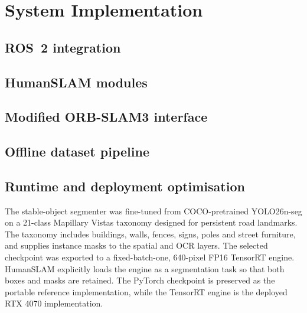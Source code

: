 \chapter{System Implementation}
\label{chap:implementation}

\section{ROS~2 integration}

\section{HumanSLAM modules}

\section{Modified ORB-SLAM3 interface}

\section{Offline dataset pipeline}

\section{Runtime and deployment optimisation}

The stable-object segmenter was fine-tuned from COCO-pretrained YOLO26n-seg on
a 21-class Mapillary Vistas taxonomy designed for persistent road landmarks.
The taxonomy includes buildings, walls, fences, signs, poles and street
furniture, and supplies instance masks to the spatial and OCR layers. The
selected checkpoint was exported to a fixed-batch-one, 640-pixel FP16 TensorRT
engine. HumanSLAM explicitly loads the engine as a segmentation task so that
both boxes and masks are retained. The PyTorch checkpoint is preserved as the
portable reference implementation, while the TensorRT engine is the deployed
RTX 4070 implementation.
